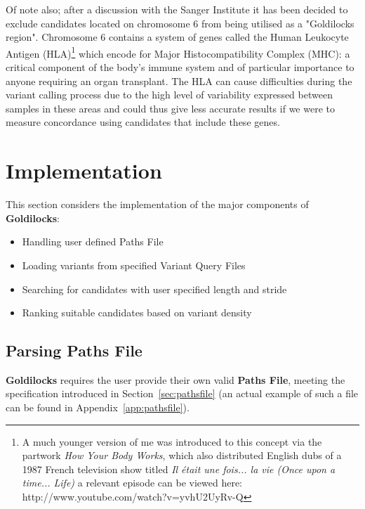 Of note also; after a discussion with the Sanger Institute it has been decided
to exclude candidates located on chromosome 6 from being utilised as a
"Goldilocks region". Chromosome 6 contains a system of genes called the
Human Leukocyte Antigen (HLA)\footnote{A much younger version of me was introduced to
    this concept via the partwork \textit{How Your Body Works}\citep{bodyworks},
    which also distributed English dubs of a 1987 French television show titled
    \textit{Il était une fois... la vie (Once upon a time...
Life)\citep{oncelife}} a relevant episode can be viewed here:
http://www.youtube.com/watch?v=yvhU2UyRv-Q} which encode for Major
Histocompatibility Complex (MHC)\citep{hla-c6}: a critical component of the
body's immune system and of particular importance to anyone requiring an organ
transplant. The HLA can cause difficulties during the variant calling process
due to the high level of variability expressed between samples in these areas
and could thus give less accurate results if we were to measure concordance
using candidates that include these genes.


\section{Implementation}

This section considers the implementation of the major components of
\textbf{Goldilocks}:

\begin{itemize}
    \item Handling user defined Paths File
    \item Loading variants from specified Variant Query Files
    \item Searching for candidates with user specified length and stride
    \item Ranking suitable candidates based on variant density
\end{itemize}

\subsection{Parsing Paths File}
\label{sec:parse-path}

\textbf{Goldilocks} requires the user provide their own valid \textbf{Paths
File}, meeting the specification introduced in Section~\ref{sec:pathsfile} (an
actual example of such a file can be found in Appendix~\ref{app:pathsfile}).

